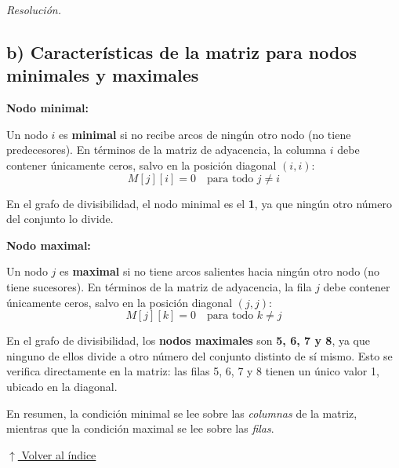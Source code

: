 \documentclass[12pt]{article}
\theoremstyle{definition}
\theoremstyle{remark}
\newenvironment{resolucion}{%
    \par\vspace{0.3em}%
    \noindent\textit{Resolución.}\quad
}{%
    \par\vspace{0.8em}%
}
\newcommand{\volverindice}{%
    \vspace{1em}%
    \begin{flushright}%
        \hyperlink{indice}{\small $\uparrow$ Volver al índice}%
    \end{flushright}%
}
\begin{document}
\begin{resolucion}
\newpage
\subsection*{b) Características de la matriz para nodos minimales y maximales}

\textbf{Nodo minimal:}

Un nodo $i$ es \textbf{minimal} si no recibe arcos de ningún otro nodo (no tiene predecesores). En términos de la matriz de adyacencia, la columna $i$ debe contener únicamente ceros, salvo en la posición diagonal $(i, i)$:
\[M[j][i] = 0 \quad \text{para todo } j \neq i\]

En el grafo de divisibilidad, el nodo minimal es el \textbf{1}, ya que ningún otro número del conjunto lo divide.

\textbf{Nodo maximal:}

Un nodo $j$ es \textbf{maximal} si no tiene arcos salientes hacia ningún otro nodo (no tiene sucesores). En términos de la matriz de adyacencia, la fila $j$ debe contener únicamente ceros, salvo en la posición diagonal $(j, j)$:
\[M[j][k] = 0 \quad \text{para todo } k \neq j\]

En el grafo de divisibilidad, los \textbf{nodos maximales} son \textbf{5, 6, 7 y 8}, ya que ninguno de ellos divide a otro número del conjunto distinto de sí mismo. Esto se verifica directamente en la matriz: las filas 5, 6, 7 y 8 tienen un único valor 1, ubicado en la diagonal.

En resumen, la condición minimal se lee sobre las \textit{columnas} de la matriz, mientras que la condición maximal se lee sobre las \textit{filas}.

\end{resolucion}

\volverindice
\end{document}
